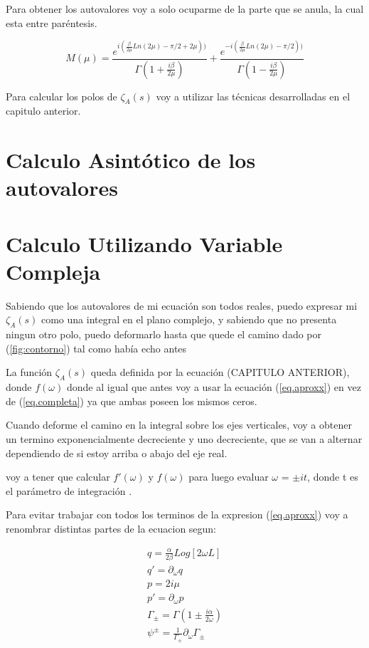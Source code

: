 Para obtener los autovalores voy a solo ocuparme de la parte que se anula, la cual esta entre paréntesis.

\begin{equation}
    M (\mu) = 
    \frac{e ^{i (\frac{\beta}{2 \mu} Ln(2 \mu) - \pi/2+ 2 \mu))}}{\Gamma(1+\frac{i \beta}{2 \mu})} + 
    \frac{e ^{- i (\frac{\beta}{2 \mu} Ln(2 \mu) - \pi/2 ))}}{\Gamma(1-\frac{i \beta}{2 \mu})}
\label{eq.aproxx}
\end{equation}

Para calcular los polos de $\zeta _A (s)$ voy a utilizar las técnicas desarrolladas en el capitulo anterior.

\section{Calculo Asintótico de los autovalores}

\section{Calculo Utilizando Variable Compleja}


Sabiendo que los autovalores de mi ecuación son todos reales, puedo expresar mi  $\zeta _A (s)$ como una integral en el plano complejo, y sabiendo que no presenta ningun otro polo, puedo deformarlo hasta que quede el camino dado por (\ref{fig:contorno}) tal como había echo antes


La función $\zeta _A (s)$ queda definida por la ecuación (CAPITULO ANTERIOR), donde $f(\omega)$ donde al igual que antes voy a usar la ecuación (\ref{eq.aproxx}) en vez de  (\ref{eq.completa}) ya que ambas poseen los mismos ceros. 

Cuando deforme el camino en la integral sobre los ejes verticales, voy a obtener un termino exponencialmente decreciente y uno decreciente, que se van a alternar dependiendo de si estoy arriba o abajo del eje real.

voy a tener que calcular $f'(\omega)$ y $f(\omega)$ para luego evaluar $\omega$ = $\pm i t$, donde t es el parámetro de integración .

Para evitar trabajar con todos los terminos de la expresion (\ref{eq.aproxx}) voy a renombrar distintas partes de la ecuacion segun:

\begin{equation}
\begin{array}{c}
    q = \frac{\alpha}{2 \beta} Log[2 \omega L] \\
    q' = \partial _\omega q \\
    p = 2 i \mu \\
    p' = \partial _\omega p \\
    \Gamma _{\pm} = \Gamma(1 \pm \frac{i \alpha}{2 \omega}) \\
    \psi ^{\pm} = \frac{1}{\Gamma _{\pm}} \partial _{\omega}  \Gamma _{\pm} \\
\end{array}
\end{equation}

